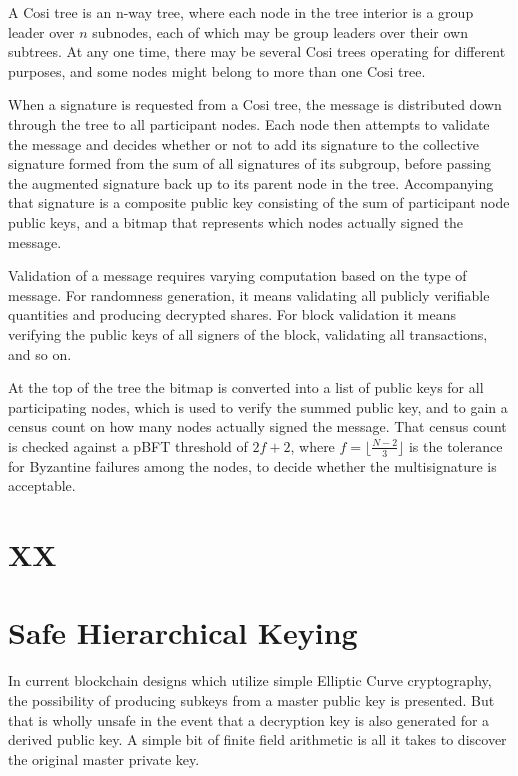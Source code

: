 \documentclass[article,oneside]{memoir}
\begin{document}
A Cosi tree is an n-way tree, where each node in the tree interior is a group leader over $n$ subnodes, each of which may be group leaders over their own subtrees. At any one time, there may be several Cosi trees operating for different purposes, and some nodes might belong to more than one Cosi tree.

When a signature is requested from a Cosi tree, the message is distributed down through the tree to all participant nodes. Each node then attempts to validate the message and decides whether or not to add its signature to the collective signature formed from the sum of all signatures of its subgroup, before passing the augmented signature back up to its parent node in the tree. Accompanying that signature is a composite public key consisting of the sum of participant node public keys, and a bitmap that represents which nodes actually signed the message.

Validation of a message requires varying computation based on the type of message. For randomness generation, it means validating all publicly verifiable quantities and producing decrypted shares. For block validation it means verifying the public keys of all signers of the block, validating all transactions, and so on.

At the top of the tree the bitmap is converted into a list of public keys for all participating nodes, which is used to verify the summed public key, and to gain a census count on how many nodes actually signed the message. That census count is checked against a pBFT threshold of $2 f+ 2$, where $f = \lfloor \frac{N-2}{3} \rfloor$ is the tolerance for Byzantine failures among the nodes, to decide whether the multisignature is acceptable. 

\chapter{XX}

\chapter{Safe Hierarchical Keying}

In current blockchain designs which utilize simple Elliptic Curve cryptography, the possibility of producing subkeys from a master public key is presented. But that is wholly unsafe in the event that a decryption key is also generated for a derived public key. A simple bit of finite field arithmetic is all it takes to discover the original master private key.
\end{document}
